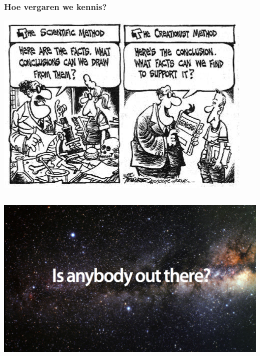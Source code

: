 \documentclass[aspectratio=169]{beamer}
\begin{document}
\begin{frame}
  \frametitle{Hoe vergaren we kennis?}

  \centering
  \includegraphics[height=.8\textheight]{img/les1-02}
\end{frame}

\begin{frame}[plain,c]
  \begin{columns}
    \column{\dimexpr\paperwidth}
    \includegraphics[width=\paperwidth]{img/les1-03}
  \end{columns}
\end{frame}
\end{document}
